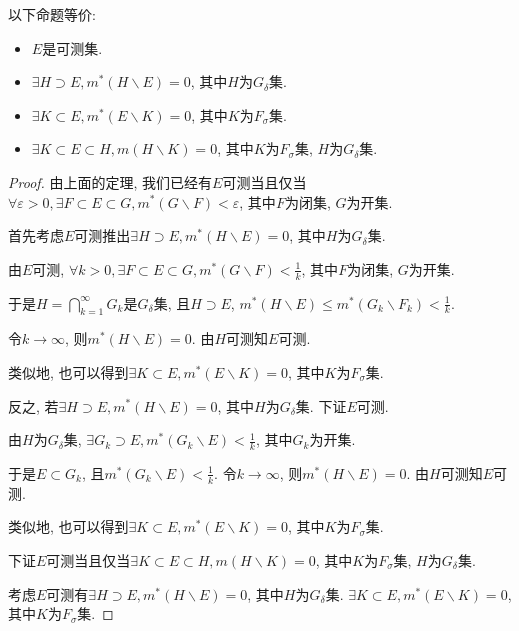 \documentclass[theorem=false,mathfont=none,openany,sub3section]{easybook}
\begin{document}
\begin{theorem}
  以下命题等价:\par
  \begin{itemize}
    \item $E$是可测集.
    \item $\exists H\supset E, m^{*}(H\backslash E)=0$, 其中$H$为$G_{\delta}$集.
    \item $\exists K\subset E, m^{*}(E\backslash K)=0$, 其中$K$为$F_{\sigma}$集.
    \item $\exists K\subset E\subset H, m(H\backslash K)=0$, 其中$K$为$F_{\sigma}$集, $H$为$G_{\delta}$集.
  \end{itemize}
\end{theorem}

\begin{proof}
  由上面的定理, 我们已经有$E$可测当且仅当$\forall \varepsilon>0, \exists F\subset E\subset G, m^{*}(G\backslash F)<\varepsilon $, 其中$F$为闭集, $G$为开集.\par
  首先考虑$E$可测推出$\exists H\supset E, m^{*}(H\backslash E)=0$, 其中$H$为$G_{\delta}$集.\par
  由$E$可测, $\forall k>0, \exists F\subset E\subset G, m^{*}(G\backslash F)<\frac{1}{k} $, 其中$F$为闭集, $G$为开集.\par
  于是$H=\bigcap_{k=1}^{\infty}G_k$是$G_{\delta}$集, 且$H\supset E$, $m^{*}(H\backslash E)\leqslant m^{*}(G_k\backslash F_k)<\frac{1}{k}$.\par
  令$k\to \infty$, 则$m^{*}(H\backslash E)=0$. 由$H$可测知$E$可测.\par
  类似地, 也可以得到$\exists K\subset E, m^{*}(E\backslash K)=0$, 其中$K$为$F_{\sigma}$集.\par
  反之, 若$\exists H\supset E, m^{*}(H\backslash E)=0$, 其中$H$为$G_{\delta}$集. 下证$E$可测.\par
  由$H$为$G_{\delta}$集, $\exists G_k\supset E, m^{*}(G_k\backslash E)<\frac{1}{k}$, 其中$G_k$为开集.\par
  于是$E\subset G_k$, 且$m^{*}(G_k\backslash E)<\frac{1}{k}$. 令$k \to \infty$, 则$m^{*}(H\backslash E)=0$. 由$H$可测知$E$可测.\par
  类似地, 也可以得到$\exists K\subset E, m^{*}(E\backslash K)=0$, 其中$K$为$F_{\sigma}$集.\par
  下证$E$可测当且仅当$\exists K\subset E\subset H, m(H\backslash K)=0$, 其中$K$为$F_{\sigma}$集, $H$为$G_{\delta}$集.\par
  考虑$E$可测有$\exists H\supset E, m^{*}(H\backslash E)=0$, 其中$H$为$G_{\delta}$集. $\exists K\subset E, m^{*}(E\backslash K)=0$, 其中$K$为$F_{\sigma}$集.\par

\end{proof}
\end{document}
